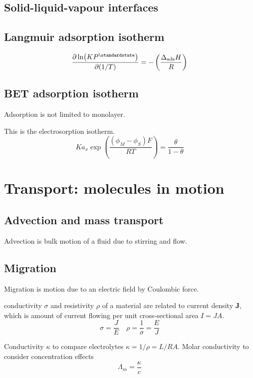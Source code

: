 \subsection*{Solid-liquid-vapour interfaces}

\subsection*{Langmuir adsorption isotherm}
\begin{equation*}
    \pdv{\ln(KP^\standardstate)}{(1/T)} = - \left(\frac{\Delta_{\textrm{ads}}H}{R}\right)
\end{equation*}

\subsection*{BET adsorption isotherm}
Adsorption is not limited to monolayer.

This is the electrosorption isotherm.
\begin{equation*}
    Ka_x \exp(\frac{(\phi_M - \phi_S)F}{RT}) = \frac{\theta}{1 - \theta}
\end{equation*}

\section{Transport: molecules in motion}

\subsection*{Advection and mass transport}
Advection is bulk motion of a fluid due to stirring and flow.

\subsection*{Migration}
Migration is motion due to an electric field by Coulombic force.

conductivity $\sigma$ and resistivity $\rho$ of a material are related to current density $\mathbf{J}$, which is
amount of current flowing per unit cross-sectional area $I = JA$.
\begin{equation*}
    \sigma = \frac{J}{E} \quad \rho = \frac{1}{\sigma} = \frac{E}{J}
\end{equation*}

Conductivity $\kappa$ to compare electrolytes $\kappa = 1/\rho = L/RA$. Molar conductivity to consider concentration effects
\begin{equation*}
    \Lambda_m = \frac{\kappa}{c}
\end{equation*}

